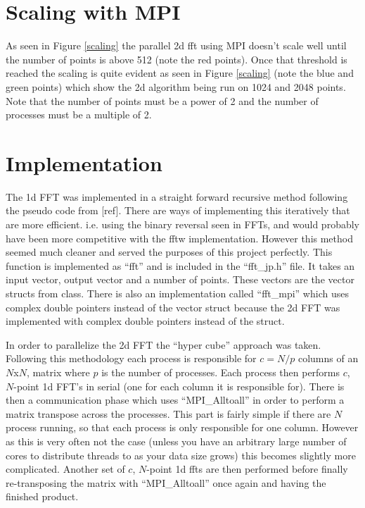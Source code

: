 \documentclass[12pt]{article}
\begin{document}
\section{Scaling with MPI}
As seen in Figure \ref{scaling} the parallel 2d fft using MPI doesn't scale well until
the number of points is above 512 (note the red points). Once that threshold is reached the scaling
is quite evident as seen in Figure \ref{scaling} (note the blue and green points) which show the 2d algorithm
being run on 1024 and 2048 points. Note that the number of points must
be a power of 2 and the number of processes must be a multiple of 2.


\section{Implementation}
The 1d FFT was implemented in a straight forward recursive method following
the pseudo code from [ref]. There are ways of implementing this iteratively
that are more efficient. i.e. using the binary reversal seen in FFTs, and
would probably have been more competitive with the fftw implementation.
However this method seemed much cleaner and served the purposes of this
project perfectly. This function is implemented as ``fft'' and is included
in the ``fft\_jp.h'' file. It takes an input vector, output vector and
a number of points. These vectors are the vector structs from class. There
is also an implementation called ``fft\_mpi'' which uses complex double
pointers instead of the vector struct because the 2d FFT was implemented with
complex double pointers instead of the struct.

In order to parallelize the 2d FFT the ``hyper cube'' approach was taken. Following this methodology each process is responsible for $c = N / p$ columns of
an $N$x$N$, matrix where $p$ is the number of processes. Each process then performs $c$, $N$-point 1d FFT's in serial (one for each column it is responsible for).
There is then a communication phase which uses ``MPI\_Alltoall'' in order to perform a matrix transpose across the processes. This part is fairly simple if
there are $N$ process running, so that each process is only responsible for one column. However as this is very often not the case (unless you have an arbitrary
large number of cores to distribute threads to as your data size grows) this becomes slightly more complicated. Another set of $c$, $N$-point 1d ffts are then
performed before finally re-transposing the matrix with ``MPI\_Alltoall'' once 
again and having the finished product. 
\end{document}
